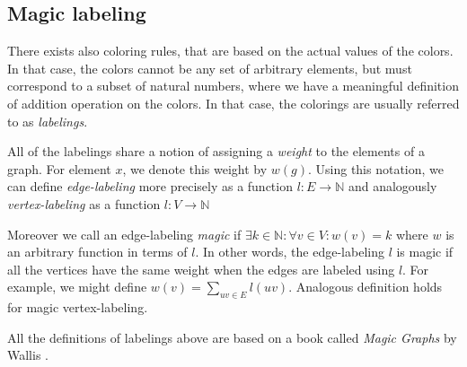 \subsection{Magic labeling}

There exists also coloring rules, that are based on the actual values of the colors. In that case, the colors cannot be any set of arbitrary elements, but must correspond to a subset of natural numbers, where we have a meaningful definition of addition operation on the colors. In that case, the colorings are usually referred to as \textit{labelings}.

\begin{highlight}

All of the labelings share a notion of assigning a \textit{weight} to the elements of a graph. For element $x$, we denote this weight by $w(g)$. Using this notation, we can define \textit{edge-labeling} more precisely as a function $l:E \rightarrow \mathbb{N}$ and analogously \textit{vertex-labeling} as a function $l:V \rightarrow \mathbb{N}$

Moreover we call an edge-labeling \textit{magic} if $\exists k \in \mathbb{N} : \forall v \in V:w(v) = k$ where $w$ is an arbitrary function in terms of $l$. In other words, the edge-labeling $l$ is magic if all the vertices have the same weight when the edges are labeled using $l$. For example, we might define $w(v) = \sum_{uv \in E}l(uv)$. Analogous definition holds for magic vertex-labeling.

All the definitions of labelings above are based on a book called \textit{Magic Graphs} by Wallis \cite{marrwall2013}.

\end{highlight}

\vspace{5pt}
